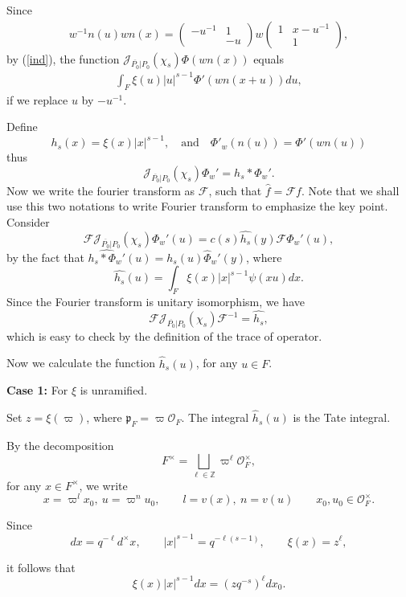 \documentclass[11pt]{amsart}
\theoremstyle{definition}
\numberwithin{equation}{section}
\begin{document}
	
	Since \begin{align*}
		w^{-1}n(u)wn(x)=\left(\begin{matrix}
			-u^{-1}&1\\
			&-u
		\end{matrix}\right)w\left(\begin{matrix}
			1&x-u^{-1}\\
			&1
		\end{matrix}\right),
	\end{align*}
	by (\ref{ind}), the function \(\mathscr{J}_{\overline{P_0}|P_0}(\chi_s)\Phi(wn(x))\) equals
	\begin{align}
		\int_{F}\xi(u)|u|^{s-1}\Phi'(wn(x+u))du,
	\end{align}
	if we replace \(u\) by \(-u^{-1}\).
	
	
	
	
	Define \[h_s(x)=\xi(x)|x|^{s-1},\quad \text{and}\quad\Phi'_w(n(u))=\Phi'(wn(u))\]thus \[\mathscr{J}_{\overline{P_0}|P_0}(\chi_s)\Phi_w'=h_s*\Phi_w'.\]
	Now we write the fourier transform as \(\mathcal{F}\), such that \(\hat{f}=\mathcal{F}f\). Note that we shall use this two notations to write Fourier transform to emphasize the key point. Consider \[\mathcal{F}\mathscr{J}_{\overline{P_0}|P_0}(\chi_s)\Phi_w'(u)=c(s)\widehat{h_s}(y)\mathcal{F}\Phi_w'(u),\]by the fact that \(\widehat{h_s*\Phi_w'}(u)=\widehat{h_s}(u)\hat{\Phi}_w'(y)\), where \[\widehat{h_s}(u)=\int_F\xi(x)|x|^{s-1}\psi(xu)dx.\]
	Since the Fourier transform is unitary isomorphism, we have\[\mathcal{F}\mathscr{J}_{\overline{P_0}|P_0}(\chi_s)\mathcal{F}^{-1}=\widehat{h_s},\]which is easy to check by the definition of the trace of operator.
	
	
	Now we calculate the function \(\hat{h}_s(u)\), for any \(u\in F\).
	
	
	\noindent\textbf{Case 1:} For \(\xi\) is unramified.
	
	
	Set \(z=\xi(\varpi)\), where \(\mathfrak{p}_F=\varpi\mathcal{O}_F\). The integral \(\hat{h}_s(u)\) is the Tate integral.
	
	
	By the decomposition
	\[
	F^\times = \bigsqcup_{\ell \in \mathbb{Z}} \varpi^\ell \mathcal{O}_F^\times,
	\]for any \(x\in F^\times\), we write
	\[
	x = \varpi^l x_0,\ u=\varpi^nu_0, \qquad l = v(x),\ n=v(u) \qquad x_0,u_0 \in \mathcal{O}_F^\times.
	\]
	
	Since
	\[
	dx = q^{-\ell} d^\times x, \qquad |x|^{s-1} = q^{-\ell(s-1)}, \qquad \xi(x) = z^\ell,
	\]
	
	it follows that
	\[
	\xi(x)|x|^{s-1} dx = (z q^{-s})^\ell dx_0.
	\]
	
\end{document}

